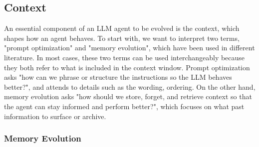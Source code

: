 \documentclass[10pt]{article} %
\begin{document}
\subsection{Context}

An essential component of an LLM agent to be evolved is the context, which shapes how an agent behaves. To start with, we want to interpret two terms, "prompt optimization" and "memory evolution", which have been used in different literature. In most cases, these two terms can be used interchangeably because they both refer to what is included in the context window. Prompt optimization asks "how can we phrase or structure the instructions so the LLM behaves better?", and attends to details such as the wording, ordering. On the other hand, memory evolution asks "how should we store, forget, and retrieve context so that the agent can stay informed and perform better?", which focuses on what past information to surface or archive.

\subsubsection{Memory Evolution} 
\end{document}
